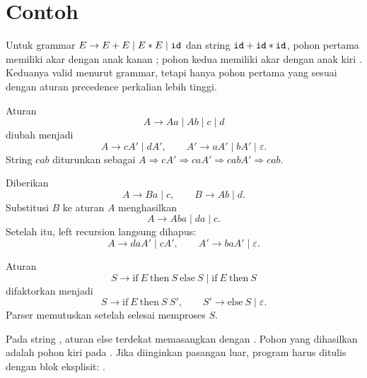 \section*{Contoh}

\begin{contoh}
Untuk grammar \(E \to E + E \mid E * E \mid \texttt{id}\) dan string
\(\texttt{id} + \texttt{id} * \texttt{id}\), pohon pertama memiliki akar
\code{+} dengan anak kanan \code{*}; pohon kedua memiliki akar
\code{*} dengan anak kiri \code{+}. Keduanya valid menurut grammar,
tetapi hanya pohon pertama yang sesuai dengan aturan precedence
perkalian lebih tinggi.
\end{contoh}

\begin{contoh}
Aturan
\[
A \to A a \mid A b \mid c \mid d
\]
diubah menjadi
\[
A \to c A' \mid d A', \qquad
A' \to a A' \mid b A' \mid \varepsilon.
\]
String \(c a b\) diturunkan sebagai
\(A \Rightarrow cA' \Rightarrow caA' \Rightarrow cabA'
\Rightarrow cab\).
\end{contoh}

\begin{contoh}
Diberikan
\[
A \to B a \mid c, \qquad B \to A b \mid d.
\]
Substitusi \(B\) ke aturan \(A\) menghasilkan
\[
A \to A b a \mid d a \mid c.
\]
Setelah itu, left recursion langsung dihapus:
\[
A \to d a A' \mid c A', \qquad
A' \to b a A' \mid \varepsilon.
\]
\end{contoh}

\begin{contoh}
Aturan
\[
S \to \text{if}\ E\ \text{then}\ S\ \text{else}\ S
\mid \text{if}\ E\ \text{then}\ S
\]
difaktorkan menjadi
\[
S \to \text{if}\ E\ \text{then}\ S\ S', \qquad
S' \to \text{else}\ S \mid \varepsilon.
\]
Parser memutuskan  setelah selesai memproses \(S\).
\end{contoh}

\begin{contoh}
Pada string
, aturan else terdekat memasangkan
 dengan . Pohon yang dihasilkan adalah
pohon kiri pada . Jika diinginkan
pasangan luar, program harus ditulis dengan blok eksplisit:
.
\end{contoh}
